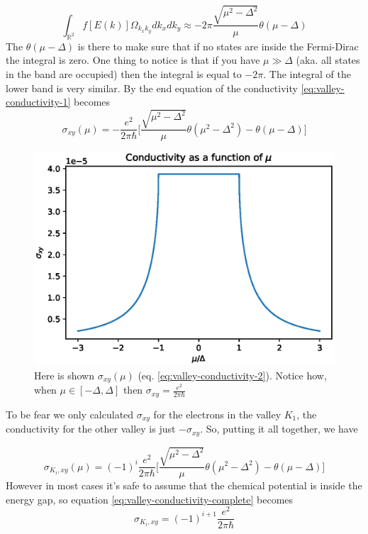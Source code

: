 \begin{equation}
    \int_{\mathbb R^2} f[E(k)]\Omega_{k_xk_y}dk_xdk_y\approx-2\pi \frac{\sqrt{\mu^2-\Delta^2}}\mu\theta(\mu-\Delta)
\end{equation}
The $\theta(\mu-\Delta)$ is there to make sure that if no states are inside the Fermi-Dirac the integral is zero. One thing to notice is that if you have $\mu \gg \Delta$ (aka. all states in the band are occupied) then the integral is equal to $-2\pi$. The integral of the lower band is very similar. By the end equation of the conductivity \ref{eq:valley-conductivity-1} becomes
\begin{equation}
    \sigma_{xy}(\mu)=-\frac {e^2}{2\pi \hbar}\Bigg[\frac{\sqrt{\mu^2-\Delta^2}}{\mu} \theta(\mu^2-\Delta^2) - \theta(\mu-\Delta)\Bigg]
    \label{eq:valley-conductivity-2}
\end{equation}
\begin{figure}
    \centering
    \includegraphics[width=\linewidth]{Immagini/ValleyHall/sigma_xy.eps}
    \caption{Here is shown $\sigma_{xy}(\mu)$ (eq. \ref{eq:valley-conductivity-2}). Notice how, when $\mu \in [-\Delta,\Delta]$ then $\sigma_{xy}=\frac {e^2}{2\pi \hbar}$}
    \label{fig:sigma_xy}
\end{figure}
To be fear we only calculated $\sigma_{xy}$ for the electrons in the valley $K_1$, the conductivity for the other valley is just $-\sigma_{xy}$. So, putting it all together, we have

\begin{equation}
    \sigma_{K_i,xy}(\mu)=(-1)^i\frac {e^2}{2\pi \hbar}\Bigg[\frac{\sqrt{\mu^2-\Delta^2}}{\mu} \theta(\mu^2-\Delta^2) - \theta(\mu-\Delta)\Bigg]
    \label{eq:valley-conductivity-complete}
\end{equation}
However in most cases it's safe to assume that the chemical potential is inside the energy gap, so equation \ref{eq:valley-conductivity-complete} becomes
\begin{equation}
    \sigma_{K_i,xy}=(-1)^{i+1}\frac {e^2}{2\pi \hbar}
\end{equation}



